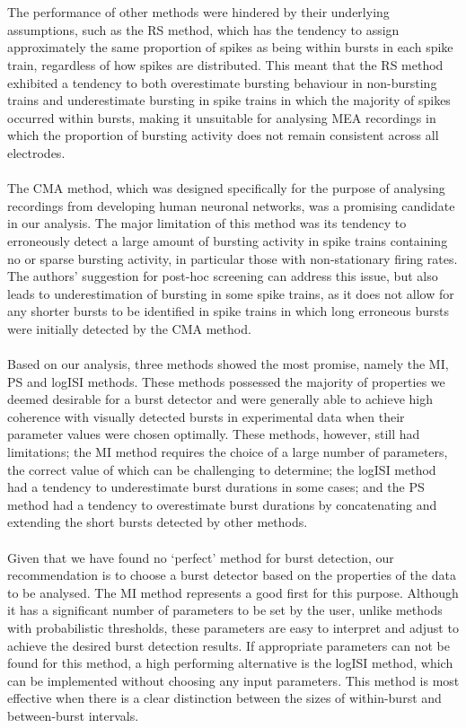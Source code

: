 \documentclass[12pt, titlepage]{article}
\begin{document}
\\ \\The performance of other methods were hindered by their underlying assumptions, such as the RS method, which has the tendency to assign approximately the same proportion of spikes as being within bursts in each spike train, regardless of how spikes are distributed. This meant that the RS method exhibited a tendency to both overestimate bursting behaviour in non-bursting trains and underestimate bursting in spike trains in which the majority of spikes occurred within bursts, making it unsuitable for analysing MEA recordings in which the proportion of bursting activity does not remain consistent across all electrodes.
\\ \\The CMA method, which was designed specifically for the purpose of analysing recordings from developing human neuronal networks, was a promising candidate in our analysis. The major limitation of this method was its tendency to erroneously detect a large amount of bursting activity in spike trains containing no or sparse bursting activity, in particular those with non-stationary firing rates.  The authors’ suggestion for post-hoc screening can address this issue, but also leads to underestimation of bursting in some spike trains, as it does not allow for any shorter bursts to be identified in spike trains in which long erroneous bursts were initially detected by the CMA method. 
\\ \\ Based on our analysis, three methods showed the most promise, namely the MI, PS and logISI methods. These methods possessed the majority of properties we deemed desirable for a burst detector and were generally able to achieve high coherence with visually detected bursts in experimental data when their parameter values were chosen optimally. These methods, however, still had limitations; the MI method requires the choice of a large number of parameters, the correct value of which can be challenging to determine; the logISI method had a tendency to underestimate burst durations in some cases; and the PS method had a tendency to overestimate burst durations by concatenating and extending the short bursts detected by other methods.
\\ \\Given that we have found no `perfect' method for burst detection, our recommendation is to choose a burst detector based on the properties of the data to be analysed. The MI method represents a good first for this purpose. Although it has a significant number of parameters to be set by the user, unlike methods with probabilistic thresholds, these parameters are easy to interpret and adjust to achieve the desired burst detection results. If appropriate parameters can not be found for this method, a high performing alternative is the logISI method, which can be implemented without choosing any input parameters. This method is most effective when there is a clear distinction between the sizes of within-burst and between-burst intervals. 
\end{document}
